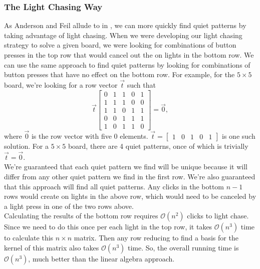 \documentclass[a4paper]{article}
\renewcommand{\O}{\mathcal{O}}
\begin{document}
	\subsubsection{The Light Chasing Way}
	As Anderson and Feil allude to in \cite{anderson_feil}, we can more quickly find quiet patterns by taking advantage of light chasing.
	When we were developing our light chasing strategy to solve a given board, we were looking for combinations of button presses in the top row that would cancel out the on lights in the bottom row.
	We can use the same approach to find quiet patterns by looking for combinations of button presses that have no effect on the bottom row.
	For example, for the $5 \times 5$ board, we're looking for a row vector $\vec{t}$ such that
	\begin{equation*}
		\vec{t}\begin{bmatrix}
			0 & 1 & 1 & 0 & 1 \\
			1 & 1 & 1 & 0 & 0 \\
			1 & 1 & 0 & 1 & 1 \\
			0 & 0 & 1 & 1 & 1 \\
			1 & 0 & 1 & 1 & 0
		\end{bmatrix} = \vec{0},
	\end{equation*}
	where $\vec{0}$ is the row vector with five 0 elements.
	$\vec{t} = \begin{bmatrix} 1 & 0 & 1 & 0 & 1 \end{bmatrix}$ is one such solution.
	For a $5 \times 5$ board, there are 4 quiet patterns, once of which is trivially $\vec{t} = \vec{0}$. \\
	
	We're  guaranteed that each quiet pattern we find will be unique because it will differ from any other quiet pattern we find in the first row.
	We're also guaranteed that this approach will find all quiet patterns.
	Any clicks in the bottom $n-1$ rows would create on lights in the above row, which would need to be canceled by a light press in one of the two rows above. \\
	
	Calculating the results of the bottom row requires $\O(n^2)$ clicks to light chase.
	Since we need to do this once per each light in the top row, it takes $\O(n^3)$ time to calculate this $n \times n$ matrix.
	Then any row reducing to find a basis for the kernel of this matrix also takes $\O(n^3)$ time.
	So, the overall running time is $\O(n^3)$, much better than the linear algebra approach.
	
\end{document}
